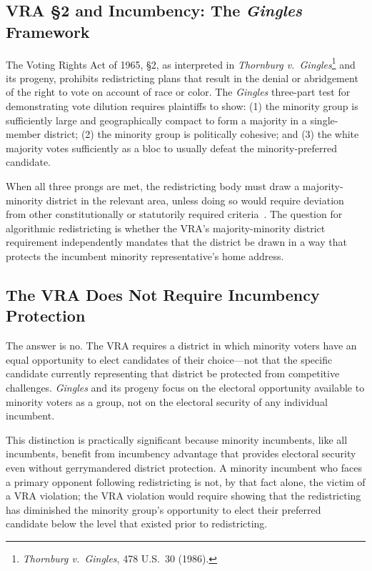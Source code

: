 \label{sec:results}

\subsection{VRA \S{}2 and Incumbency: The \textit{Gingles} Framework}

The Voting Rights Act of 1965, \S{}2, as interpreted in \textit{Thornburg v.\
Gingles}\footnote{\textit{Thornburg v.\ Gingles}, 478 U.S.\ 30 (1986).} and its progeny,
prohibits redistricting plans that result in the denial or abridgement of the right
to vote on account of race or color. The \textit{Gingles} three-part test for
demonstrating vote dilution requires plaintiffs to show: (1) the minority group is
sufficiently large and geographically compact to form a majority in a single-member
district; (2) the minority group is politically cohesive; and (3) the white majority
votes sufficiently as a bloc to usually defeat the minority-preferred candidate.

When all three prongs are met, the redistricting body must draw a majority-minority
district in the relevant area, unless doing so would require deviation from other
constitutionally or statutorily required criteria~\citep{gingles1986}. The question
for algorithmic redistricting is whether the VRA's majority-minority district requirement
independently mandates that the district be drawn in a way that protects the incumbent
minority representative's home address.

\subsection{The VRA Does Not Require Incumbency Protection}

The answer is no. The VRA requires a district in which minority voters have an equal
opportunity to elect candidates of their choice---not that the specific candidate
currently representing that district be protected from competitive challenges.
\textit{Gingles} and its progeny focus on the electoral opportunity available to
minority voters as a group, not on the electoral security of any individual incumbent.

This distinction is practically significant because minority incumbents, like all
incumbents, benefit from incumbency advantage that provides electoral security even
without gerrymandered district protection. A minority incumbent who faces a primary
opponent following redistricting is not, by that fact alone, the victim of a VRA
violation; the VRA violation would require showing that the redistricting has diminished
the minority group's opportunity to elect their preferred candidate below the level
that existed prior to redistricting.


